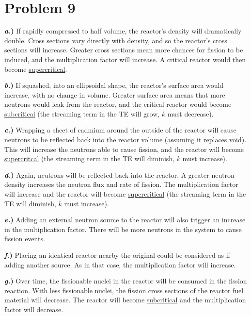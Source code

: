 \documentclass{article}
\begin{document}

\section*{Problem 9}

\textbf{\textit{a.})} If rapidly compressed to half volume, the reactor's density will dramatically double. Cross sections vary directly with density, and so the reactor's cross sections will increase. Greater cross sections mean more chances for fission to be induced, and the multiplication factor will increase. A critical reactor would then become \underline{supercritical}.

\textbf{\textit{b.})} If squashed, into an ellipsoidal shape, the reactor's surface area would increase, with no change in volume. Greater surface area means that more neutrons would leak from the reactor, and the critical reactor would become \underline{subcritical} (the streaming term in the TE will grow, $k$ must decrease).

\textbf{\textit{c.})} Wrapping a sheet of cadmium around the outside of the reactor will cause neutrons to be reflected back into the reactor volume (assuming it replaces void). This will increase the neutrons able to cause fission, and the reactor will become \underline{supercritcal}  (the streaming term in the TE will diminish, $k$ must increase).

\textbf{\textit{d.})} Again, neutrons will be reflected back into the reactor. A greater neutron density increases the neutron flux and rate of fission. The multiplication factor will increase and the reactor will become \underline{supercritical}  (the streaming term in the TE will diminish, $k$ must increase).

\textbf{\textit{e.})} Adding an external neutron source to the reactor will also trigger an increase in the multiplication factor. There will be more neutrons in the system to cause fission events.

\textbf{\textit{f.})} Placing an identical reactor nearby the original could be considered as if adding another source. As in that case, the multiplication factor will increase.

\textbf{\textit{g.})} Over time, the fissionable nuclei in the reactor will be consumed in the fission reaction. With less fissionable nuclei, the fission cross sections of the reactor fuel material will decrease. The reactor will become \underline{subcritical} and the multiplication factor will decrease.
\end{document}
